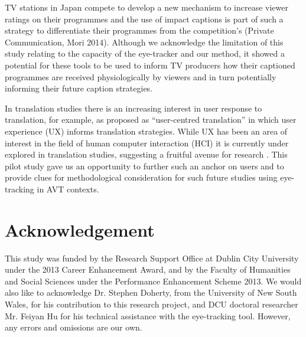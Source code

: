 \documentclass[output=paper]{langsci/langscibook}
\begin{document}
TV stations in Japan compete to develop a new mechanism to increase viewer ratings on their programmes and the use of impact captions is part of such a strategy to differentiate their programmes from the competition's (Private Communication, Mori 2014). Although we acknowledge the limitation of this study relating to the capacity of the eye-tracker and our method, it showed a potential for these tools to be used to inform TV producers how their captioned programmes are received physiologically by viewers and in turn potentially informing their future caption strategies.  



In translation studies there is an increasing interest in user response to translation, for example, as proposed as ``user-centred translation'' \citep{Suojanen2015} in which user experience (UX) informs translation strategies. While UX has been an area of interest in the field of human computer interaction (HCI) it is currently under explored in translation studies, suggesting a fruitful avenue for research \citep[312--318]{ohagan2013}. This pilot study gave us an opportunity to further such an anchor on users and to provide clues for methodological consideration for such future studies using eye-tracking in AVT contexts. 


\section*{Acknowledgement}

This study was funded by the Research Support Office at Dublin City University under the 2013 Career Enhancement Award, and by the Faculty of Humanities and Social Sciences under the Performance Enhancement Scheme 2013. We would also like to acknowledge Dr. Stephen Doherty, from the University of New South Wales, for his contribution to this research project, and DCU doctoral researcher Mr. Feiyan Hu for his technical assistance with the eye-tracking tool. However, any errors and omissions are our own. 
\end{document}
